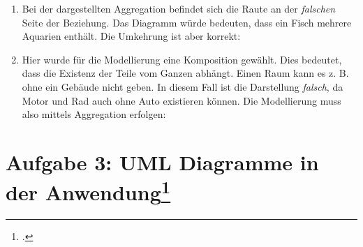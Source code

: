 \documentclass{lehramt-informatik}
\begin{document}
\begin{enumerate}
\item \strut


\begin{antwort}
Bei der dargestellten Aggregation befindet sich die Raute an der
\emph{falschen} Seite der Beziehung. Das Diagramm würde bedeuten, dass
ein Fisch mehrere Aquarien enthält. Die Umkehrung ist aber korrekt:

\end{antwort}

\item \strut


\begin{antwort}
Hier wurde für die Modellierung eine Komposition gewählt. Dies bedeutet,
dass die Existenz der Teile vom Ganzen abhängt. Einen Raum kann es z. B.
ohne ein Gebäude nicht geben. In diesem Fall ist die Darstellung
\emph{falsch}, da Motor und Rad auch ohne Auto existieren können. Die
Modellierung muss also mittels Aggregation erfolgen:

\end{antwort}

\end{enumerate}

%

\section{Aufgabe 3: UML Diagramme in der Anwendung\footcite{sosy:pu:2}}
\end{document}
